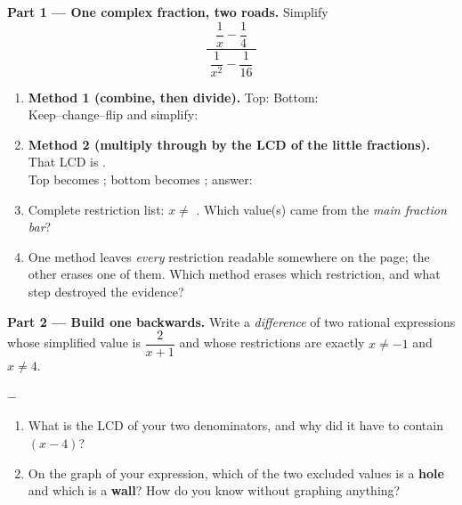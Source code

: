 \documentclass[10pt]{article}
\begin{document}
\begin{tcolorbox}[colback=white, colframe=black!40, title=\textbf{Tier E --- Extension},
    fonttitle=\bfseries, arc=1.5mm, left=3mm, right=3mm, top=2mm, bottom=2mm, breakable]
\textbf{Part 1 --- One complex fraction, two roads.} Simplify
\[
  \frac{\;\dfrac{1}{x}-\dfrac{1}{4}\;}{\;\dfrac{1}{x^2}-\dfrac{1}{16}\;}
\]
\begin{enumerate}[label=(\alph*), leftmargin=1.9em, itemsep=6pt]
  \item \textbf{Method 1 (combine, then divide).} Top:  \quad Bottom: 
        \\[3pt]
        Keep--change--flip and simplify: 
  \item \textbf{Method 2 (multiply through by the LCD of the little fractions).} That LCD is
        . \\[3pt]
        Top becomes  ; bottom becomes  ; answer: 
  \item Complete restriction list: $x\neq$ . Which value(s) came from the \emph{main
        fraction bar}? 
  \item One method leaves \emph{every} restriction readable somewhere on the page; the other erases
        one of them. Which method erases which restriction, and what step destroyed the evidence?
\end{enumerate}

\vspace{5pt}
\textbf{Part 2 --- Build one backwards.} Write a \emph{difference} of two rational expressions whose
simplified value is $\dfrac{2}{x+1}$ and whose restrictions are exactly $x\neq-1$ and $x\neq4$.
\begin{center}
 $-$ 
\end{center}
\begin{enumerate}[label=(\alph*), leftmargin=1.9em, itemsep=5pt]
  \item What is the LCD of your two denominators, and why did it have to contain $(x-4)$?
  \item On the graph of your expression, which of the two excluded values is a \textbf{hole} and which
        is a \textbf{wall}? How do you know without graphing anything?
\end{enumerate}


\end{tcolorbox}
\end{document}

